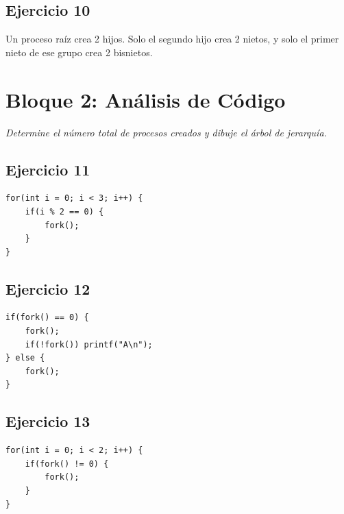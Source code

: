 \documentclass[12pt,a4paper]{article}
\begin{document}
\subsection*{Ejercicio 10}
Un proceso raíz crea 2 hijos. Solo el segundo hijo crea 2 nietos, y solo el primer nieto de ese grupo crea 2 bisnietos.
\begin{center}
\end{center}

\newpage

\section*{Bloque 2: Análisis de Código}
\textit{Determine el número total de procesos creados y dibuje el árbol de jerarquía.}

\subsection*{Ejercicio 11}
\begin{lstlisting}
for(int i = 0; i < 3; i++) {
    if(i % 2 == 0) {
        fork();
    }
}
\end{lstlisting}

\subsection*{Ejercicio 12}
\begin{lstlisting}
if(fork() == 0) {
    fork();
    if(!fork()) printf("A\n");
} else {
    fork();
}
\end{lstlisting}

\subsection*{Ejercicio 13}
\begin{lstlisting}
for(int i = 0; i < 2; i++) {
    if(fork() != 0) {
        fork();
    }
}
\end{lstlisting}
\end{document}
